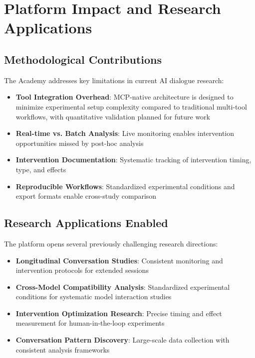 \documentclass[11pt,letterpaper]{article}
\newcommand{\theacademy}{The Academy}
\newcommand{\mcp}{MCP}
\begin{document}
\section{Platform Impact and Research Applications}

\subsection{Methodological Contributions}

\theacademy{} addresses key limitations in current AI dialogue research:

\begin{itemize}
    \item \textbf{Tool Integration Overhead}: \mcp{}-native architecture is designed to minimize experimental setup complexity compared to traditional multi-tool workflows, with quantitative validation planned for future work
    \item \textbf{Real-time vs. Batch Analysis}: Live monitoring enables intervention opportunities missed by post-hoc analysis
    \item \textbf{Intervention Documentation}: Systematic tracking of intervention timing, type, and effects
    \item \textbf{Reproducible Workflows}: Standardized experimental conditions and export formats enable cross-study comparison
\end{itemize}

\subsection{Research Applications Enabled}

The platform opens several previously challenging research directions:

\begin{itemize}
    \item \textbf{Longitudinal Conversation Studies}: Consistent monitoring and intervention protocols for extended sessions
    \item \textbf{Cross-Model Compatibility Analysis}: Standardized experimental conditions for systematic model interaction studies
    \item \textbf{Intervention Optimization Research}: Precise timing and effect measurement for human-in-the-loop experiments
    \item \textbf{Conversation Pattern Discovery}: Large-scale data collection with consistent analysis frameworks
\end{itemize}
\end{document}
